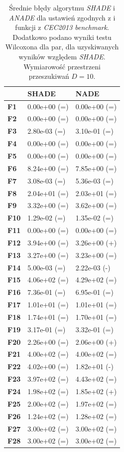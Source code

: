 \documentclass[12pt,a4paper]{report}
\begin{document}
{{{{{{\begin{table}[]
\centering
\caption{Średnie błędy algorytmu \emph{SHADE} i \emph{ANADE} dla ustawień zgodnych z \cite{SHADE} i funkcji z \emph{CEC2013 benchmark}. Dodatkowo podano wyniki testu Wilcoxona dla par, dla uzyskiwanych wyników względem \emph{SHADE}. Wymiarowość przestrzeni przeszukiwań $D = 10$.}
\label{FullEksp210}
\begin{tabular}{|l|l|l|}
\hline
          & {\bf SHADE}  & {\bf NADE}   \\ \hline
{\bf F1}  & 0.00e+00 (=) & 0.00e+00 (=) \\ \hline
{\bf F2}  & 0.00e+00 (=) & 0.00e+00 (=) \\ \hline
{\bf F3}  & 2.80e-03 (=) & 3.10e-01 (=) \\ \hline
{\bf F4}  & 0.00e+00 (=) & 0.00e+00 (=) \\ \hline
{\bf F5}  & 0.00e+00 (=) & 0.00e+00 (=) \\ \hline
{\bf F6}  & 8.24e+00 (=) & 7.85e+00 (=) \\ \hline
{\bf F7}  & 3.08e-03 (=) & 5.36e-03 (=) \\ \hline
{\bf F8}  & 2.04e+01 (=) & 2.03e+01 (=) \\ \hline
{\bf F9}  & 3.32e+00 (=) & 3.62e+00 (=) \\ \hline
{\bf F10} & 1.29e-02 (=) & 1.35e-02 (=) \\ \hline
{\bf F11} & 0.00e+00 (=) & 0.00e+00 (=) \\ \hline
{\bf F12} & 3.94e+00 (=) & 3.26e+00 (+) \\ \hline
{\bf F13} & 3.27e+00 (=) & 3.23e+00 (=) \\ \hline
{\bf F14} & 5.00e-03 (=) & 2.22e-03 (-) \\ \hline
{\bf F15} & 4.06e+02 (=) & 4.29e+02 (=) \\ \hline
{\bf F16} & 7.36e-01 (=) & 6.95e-01 (=) \\ \hline
{\bf F17} & 1.01e+01 (=) & 1.01e+01 (=) \\ \hline
{\bf F18} & 1.74e+01 (=) & 1.70e+01 (=) \\ \hline
{\bf F19} & 3.17e-01 (=) & 3.32e-01 (=) \\ \hline
{\bf F20} & 2.26e+00 (=) & 2.06e+00 (+) \\ \hline
{\bf F21} & 4.00e+02 (=) & 4.00e+02 (=) \\ \hline
{\bf F22} & 4.02e+00 (=) & 1.82e+01 (-) \\ \hline
{\bf F23} & 3.97e+02 (=) & 4.43e+02 (=) \\ \hline
{\bf F24} & 1.98e+02 (=) & 1.85e+02 (+) \\ \hline
{\bf F25} & 2.00e+02 (=) & 1.97e+02 (=) \\ \hline
{\bf F26} & 1.24e+02 (=) & 1.28e+02 (=) \\ \hline
{\bf F27} & 3.00e+02 (=) & 3.00e+02 (=) \\ \hline
{\bf F28} & 3.00e+02 (=) & 3.00e+02 (=) \\ \hline
\end{tabular}
\end{table}

}}}}}}
\end{document}
